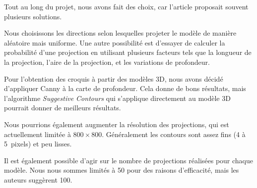 \documentclass[12pt, a4paper, oneside]{article}
\begin{document}
Tout au long du projet, nous avons fait des choix, car l'article proposait souvent plusieurs solutions.

Nous choisissons les directions selon lesquelles projeter le modèle de manière aléatoire mais uniforme.
Une autre possibilité est d'essayer de calculer la probabilité d'une projection en utilisant plusieurs facteurs tels que la longueur de la projection, l'aire de la projection, et les variations de profondeur.

Pour l'obtention des croquis à partir des modèles 3D, nous avons décidé d'appliquer Canny à la carte de profondeur.
Cela donne de bons résultats, mais l'algorithme \emph{Suggestive Contours} qui s'applique directement au modèle 3D pourrait donner de meilleurs résultats.

Nous pourrions également augmenter la résolution des projections, qui est actuellement limitée à $800 \times 800$.
Généralement les contours sont assez fins (4 à 5~pixels) et peu lisses.

Il est également possible d'agir sur le nombre de projections réalisées pour chaque modèle.
Nous nous sommes limités à 50 pour des raisons d'efficacité, mais les auteurs suggèrent 100.
\end{document}
